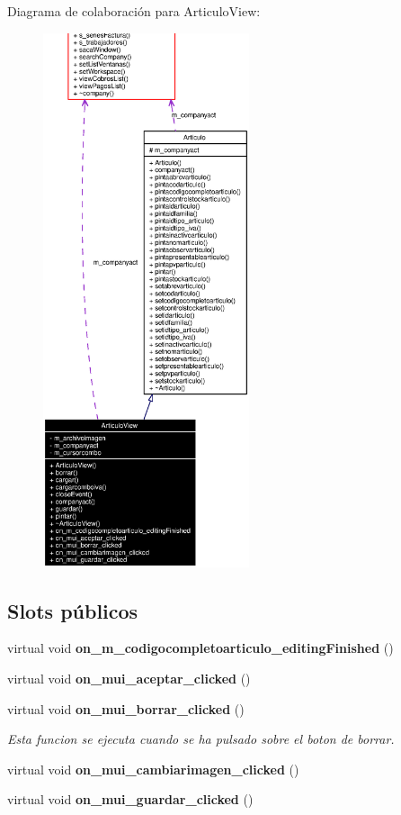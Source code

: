 Diagrama de colaboraci\'{o}n para Articulo\-View:\begin{figure}[H]
\begin{center}
\leavevmode
\includegraphics[width=172pt]{classArticuloView__coll__graph}
\end{center}
\end{figure}
\subsection*{Slots p\'{u}blicos}
\begin{CompactItemize}
\item 
virtual void {\bf on\_\-m\_\-codigocompletoarticulo\_\-editing\-Finished} ()\label{classArticuloView_i0}

\item 
virtual void {\bf on\_\-mui\_\-aceptar\_\-clicked} ()\label{classArticuloView_i1}

\item 
virtual void {\bf on\_\-mui\_\-borrar\_\-clicked} ()\label{classArticuloView_i2}

\begin{CompactList}\small\item\em Esta funcion se ejecuta cuando se ha pulsado sobre el boton de borrar. \item\end{CompactList}\item 
virtual void {\bf on\_\-mui\_\-cambiarimagen\_\-clicked} ()\label{classArticuloView_i3}

\item 
virtual void {\bf on\_\-mui\_\-guardar\_\-clicked} ()\label{classArticuloView_i4}

\end{CompactItemize}
